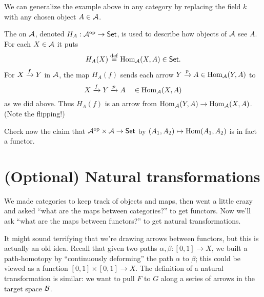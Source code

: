 
We can generalize the example above in any category by
replacing the field $k$ with any chosen object $A \in \AA$.

\begin{example}
	The  on $\AA$,
	denoted $H_A : \AA\op \to \catname{Set}$,
	is used to describe how objects of $\AA$ see $A$.
	For each $X \in \AA$ it puts \[ H_A(X) \defeq \Hom_{\AA}(X, A) \in \catname{Set}. \]
	For $X \taking{f} Y$ in $\AA$,
	the map $H_A(f)$ sends each arrow $Y \taking{p} A \in \Hom_\AA(Y,A)$ to 
	\[ X \taking{f} Y \taking{p} A \quad \in \Hom_\AA(X,A) \]
	as we did above.
	Thus $H_A(f)$ is an arrow from $\Hom_\AA(Y,A) \to \Hom_\AA(X,A)$.
	(Note the flipping!)
\end{example}

\begin{exercise}
	Check now the claim that $\AA\op \times \AA \to \catname{Set}$
	by $(A_1, A_2) \mapsto \Hom(A_1, A_2)$ is in fact a functor.
\end{exercise}

\section{(Optional) Natural transformations}
We made categories to keep track of objects and maps, then went a little crazy and asked
``what are the maps between categories?'' to get functors.
Now we'll ask ``what are the maps between functors?'' to get natural transformations.

It might sound terrifying that we're drawing arrows between functors, but this is actually an old idea.
Recall that given two paths $\alpha, \beta : [0,1] \to X$,
we built a path-homotopy by ``continuously deforming'' the path $\alpha$ to $\beta$;
this could be viewed as a function $[0,1] \times [0,1] \to X$.
The definition of a natural transformation is similar: we want to pull $F$ to $G$
along a series of arrows in the target space $\BB$.


